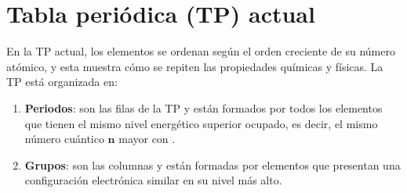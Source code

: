 \renewcommand{\tablename}{Tabla}


%
%
%

\section{Tabla periódica (TP) actual}\label{subsec:tabla-periodica-(tp)-actual}

En la TP actual, los elementos se ordenan según el orden creciente de su número atómico, y esta muestra cómo se repiten las propiedades químicas y físicas.
La TP está organizada en:
\begin{enumerate}[label=\numberballmDarkTeal]
        \item \textbf{Periodos}: son las filas de la TP y están formados por todos los elementos que tienen el mismo nivel energético superior ocupado, es decir, el mismo número cuántico $\bm{n}$ mayor con \el{}.
        \item \textbf{Grupos}: son las columnas y están formadas por elementos que presentan una configuración electrónica similar en su nivel más alto.
\end{enumerate}

